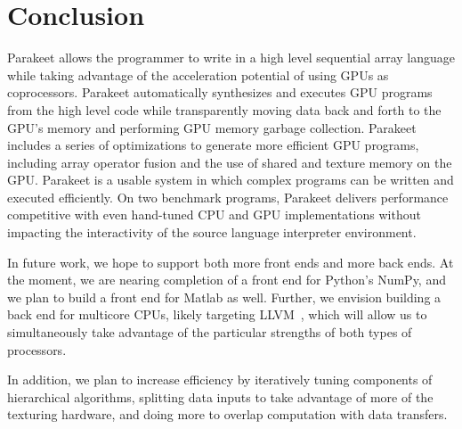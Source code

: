 \documentclass[preprint]{sigplanconf}
\begin{document}
\section{Conclusion}
\label{Conclusion}

Parakeet allows the programmer to write in a high level sequential array language while taking advantage of the acceleration potential of using GPUs as coprocessors. Parakeet automatically synthesizes and executes GPU programs from the high level code while transparently moving data back and forth to the GPU's memory and performing GPU memory garbage collection. Parakeet includes a series of optimizations to generate more efficient GPU programs, including array operator fusion and the use of shared and texture memory on the GPU.  Parakeet is a usable system in which complex programs can be written and executed efficiently.  On two benchmark programs, Parakeet delivers performance competitive with even hand-tuned CPU and GPU implementations without impacting the interactivity of the source language interpreter environment.

In future work, we hope to support both more front ends and more back ends.  At the moment, we are nearing completion of a front end for Python's NumPy, and we plan to build a front end for Matlab as well.  Further, we envision building a back end for multicore CPUs, likely targeting LLVM~\cite{Latt02}, which will allow us to simultaneously take advantage of the particular strengths of both types of processors.

In addition, we plan to increase efficiency by iteratively tuning components of hierarchical algorithms, splitting data inputs to take advantage of more of the texturing hardware, and doing more to overlap computation with data transfers.


{}
\end{document}
